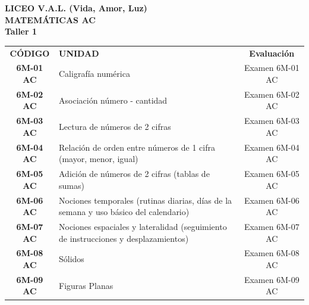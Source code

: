 \documentclass[12pt, letterpaper]{article}
\begin{document}
 
	
	\begin{center} 
		{\huge \textbf{\color{valblue} LICEO V.A.L. (Vida, Amor, Luz)}}\\[0.2cm] 
		{\Large \textbf{MATEMÁTICAS AC}}\\[0.2cm] 
		{\large \textbf{Taller 1}} 
	\end{center} 
	\vspace{0.8cm} 
	
	\renewcommand{\arraystretch}{2.5}
	
	\begin{center} 
		\large 
		\begin{tabularx}{\textwidth}{cXc} 
			\textbf{CÓDIGO} & \textbf{UNIDAD} & \textbf{Evaluación} \\ 
			\textbf{6M-01 AC} & Caligrafía numérica &  Examen 6M-01 AC \\ 
			\rowcolor{valgray} \textbf{6M-02 AC} & Asociación número - cantidad &  Examen 6M-02 AC \\ 
			\textbf{6M-03 AC} & Lectura de números de 2 cifras &  Examen 6M-03 AC \\ 
			\rowcolor{valgray} \textbf{6M-04 AC} & Relación de orden entre números de 1 cifra (mayor, menor, igual) &  Examen 6M-04 AC \\ 
			\textbf{6M-05 AC} & Adición de números de 2 cifras (tablas de sumas) &  Examen 6M-05 AC \\ 
			\rowcolor{valgray} \textbf{6M-06 AC} & Nociones temporales (rutinas diarias, días de la semana y uso básico del calendario) &  Examen 6M-06 AC \\ 
			\textbf{6M-07 AC} & Nociones espaciales y lateralidad (seguimiento de instrucciones y desplazamientos) &  Examen 6M-07 AC \\ 
			\rowcolor{valgray} \textbf{6M-08 AC} & Sólidos &  Examen 6M-08 AC \\ 
			\textbf{6M-09 AC} & Figuras Planas &  Examen 6M-09 AC \\ 
		\end{tabularx} 
	\end{center} 
	
\end{document}
